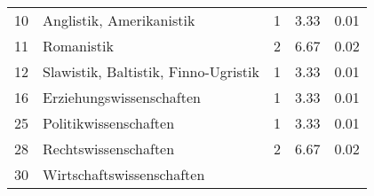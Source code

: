 \begin{longtable}{lXrrr}
     10 &
     \multicolumn{1}{X}{ Anglistik, Amerikanistik   } &


       \num{1} &
       \num[round-mode=places,round-precision=2]{3,33} &
         \num[round-mode=places,round-precision=2]{0,01} \\

     11 &
     \multicolumn{1}{X}{ Romanistik   } &


       \num{2} &
       \num[round-mode=places,round-precision=2]{6,67} &
         \num[round-mode=places,round-precision=2]{0,02} \\

     12 &
     \multicolumn{1}{X}{ Slawistik, Baltistik, Finno-Ugristik   } &


       \num{1} &
       \num[round-mode=places,round-precision=2]{3,33} &
         \num[round-mode=places,round-precision=2]{0,01} \\

     16 &
     \multicolumn{1}{X}{ Erziehungswissenschaften   } &


       \num{1} &
       \num[round-mode=places,round-precision=2]{3,33} &
         \num[round-mode=places,round-precision=2]{0,01} \\

     25 &
     \multicolumn{1}{X}{ Politikwissenschaften   } &


       \num{1} &
       \num[round-mode=places,round-precision=2]{3,33} &
         \num[round-mode=places,round-precision=2]{0,01} \\

     28 &
     \multicolumn{1}{X}{ Rechtswissenschaften   } &


       \num{2} &
       \num[round-mode=places,round-precision=2]{6,67} &
         \num[round-mode=places,round-precision=2]{0,02} \\

     30 &
     \multicolumn{1}{X}{ Wirtschaftswissenschaften   } &



\end{longtable}
